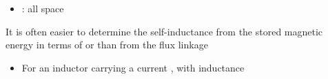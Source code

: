 \begin{ELjoin}

\begin{itemize}
\tightlist
\item
  : all space
\end{itemize}

\begin{ELremark}{}

It is often easier to determine the self-inductance from the stored magnetic energy in terms of  or  than from the flux linkage


\begin{itemize}
\tightlist
\item
  For an inductor carrying a current , with inductance 
\end{itemize}


\end{ELremark}

\end{ELjoin}


